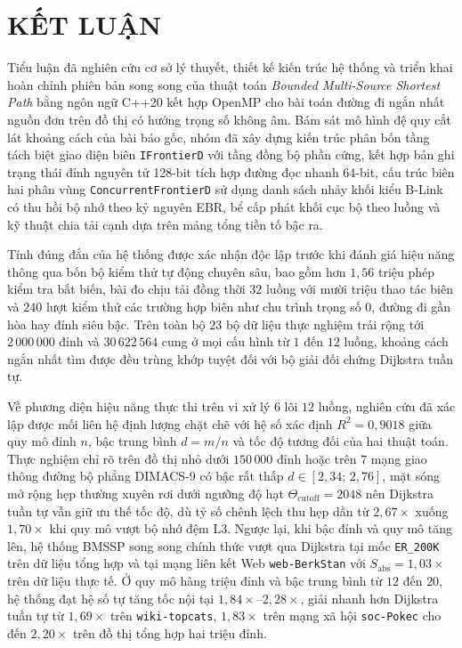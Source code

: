 \chapter*{KẾT LUẬN}

Tiểu luận đã nghiên cứu cơ sở lý thuyết, thiết kế kiến trúc hệ thống và triển khai hoàn chỉnh phiên bản song song của thuật toán \textit{Bounded Multi-Source Shortest Path} bằng ngôn ngữ C++20 kết hợp OpenMP cho bài toán đường đi ngắn nhất nguồn đơn trên đồ thị có hướng trọng số không âm. Bám sát mô hình đệ quy cắt lát khoảng cách của bài báo gốc, nhóm đã xây dựng kiến trúc phân bốn tầng tách biệt giao diện biên \texttt{IFrontierD} với tầng đồng bộ phần cứng, kết hợp bản ghi trạng thái đỉnh nguyên tử 128-bit tích hợp đường đọc nhanh 64-bit, cấu trúc biên hai phân vùng \texttt{Concurrent\allowbreak FrontierD} sử dụng danh sách nhảy khối kiểu B-Link có thu hồi bộ nhớ theo kỷ nguyên EBR, bể cấp phát khối cục bộ theo luồng và kỹ thuật chia tải cạnh dựa trên mảng tổng tiền tố bậc ra.

Tính đúng đắn của hệ thống được xác nhận độc lập trước khi đánh giá hiệu năng thông qua bốn bộ kiểm thử tự động chuyên sâu, bao gồm hơn $1{,}56$ triệu phép kiểm tra bất biến, bài đo chịu tải đồng thời $32$ luồng với mười triệu thao tác biên và $240$ lượt kiểm thử các trường hợp biên như chu trình trọng số $0$, đường đi gần hòa hay đỉnh siêu bậc. Trên toàn bộ $23$ bộ dữ liệu thực nghiệm trải rộng tới $2\,000\,000$ đỉnh và $30\,622\,564$ cung ở mọi cấu hình từ $1$ đến $12$ luồng, khoảng cách ngắn nhất tìm được đều trùng khớp tuyệt đối với bộ giải đối chứng Dijkstra tuần tự.

Về phương diện hiệu năng thực thi trên vi xử lý $6$ lõi $12$ luồng, nghiên cứu đã xác lập được mối liên hệ định lượng chặt chẽ với hệ số xác định $R^2 = 0{,}9018$ giữa quy mô đỉnh $n$, bậc trung bình $d = m/n$ và tốc độ tương đối của hai thuật toán. Thực nghiệm chỉ rõ trên đồ thị nhỏ dưới $150\,000$ đỉnh hoặc trên $7$ mạng giao thông đường bộ phẳng DIMACS-9 có bậc rất thấp $d \in [2{,}34;\, 2{,}76]$, mặt sóng mở rộng hẹp thường xuyên rơi dưới ngưỡng độ hạt $\Theta_{\mathrm{cutoff}} = 2048$ nên Dijkstra tuần tự vẫn giữ ưu thế tốc độ, dù tỷ số chênh lệch thu hẹp dần từ $2{,}67\times$ xuống $1{,}70\times$ khi quy mô vượt bộ nhớ đệm L3. Ngược lại, khi bậc đỉnh và quy mô tăng lên, hệ thống BMSSP song song chính thức vượt qua Dijkstra tại mốc \texttt{ER\_200K} trên dữ liệu tổng hợp và tại mạng liên kết Web \texttt{web-BerkStan} với $S_{\mathrm{abs}} = 1{,}03\times$ trên dữ liệu thực tế. Ở quy mô hàng triệu đỉnh và bậc trung bình từ $12$ đến $20$, hệ thống đạt hệ số tự tăng tốc nội tại $1{,}84\times$--$2{,}28\times$, giải nhanh hơn Dijkstra tuần tự từ $1{,}69\times$ trên \texttt{wiki-topcats}, $1{,}83\times$ trên mạng xã hội \texttt{soc-Pokec} cho đến $2{,}20\times$ trên đồ thị tổng hợp hai triệu đỉnh.

